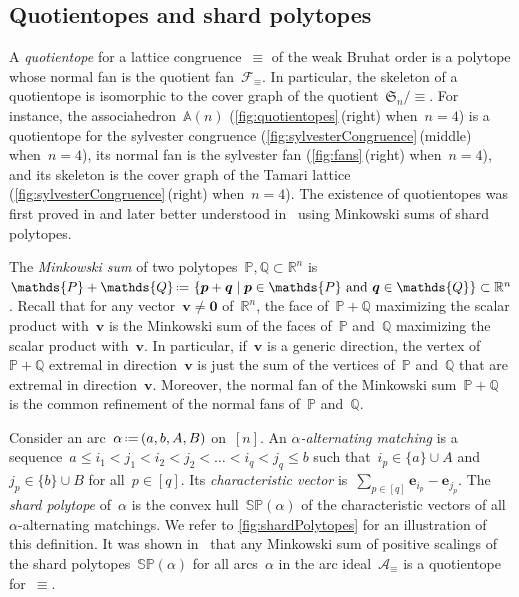 \documentclass{amsart}
\theoremstyle{definition}
\newcommand{\R}{\mathbb{R}} %
\renewcommand{\c}[1]{\mathcal{#1}} %
\renewcommand{\b}[1]{{\boldsymbol{#1}}} %
\newcommand{\f}[1]{\mathfrak{#1}} %
\newcommand{\set}[2]{\left\{ #1 \;\middle|\; #2 \right\}} %
\newcommand{\eqdef}{\mbox{\,\raisebox{0.2ex}{\scriptsize\ensuremath{\mathrm:}}\ensuremath{=}\,}} %
\newcommand{\darkblue}{\color{darkblue}} %
\newcommand{\defn}[1]{\textsl{\darkblue #1}} %
\newcommand{\polytope}[1]{\mathds{#1}} %
\newcommand{\Asso}{\polytope{A}} %
\newcommand{\SP}{\polytope{SP}}
\begin{document}

\subsection{Quotientopes and shard polytopes}
\label{subsec:quotientopes}

A \defn{quotientope} for a lattice congruence~$\equiv$ of the weak Bruhat order is a polytope whose normal fan is the quotient fan~$\c{F}_\equiv$.
In particular, the skeleton of a quotientope is isomorphic to the cover graph of the quotient~$\f{S}_n/{\equiv}$.
For instance, the associahedron~$\Asso(n)$ (\cref{fig:quotientopes}\,(right) when~$n = 4$) is a quotientope for the sylvester congruence (\cref{fig:sylvesterCongruence}\,(middle) when~$n = 4$), its normal fan is the sylvester fan (\cref{fig:fans}\,(right) when~$n = 4$), and its skeleton is the cover graph of the Tamari lattice (\cref{fig:sylvesterCongruence}\,(right) when~$n = 4$).
The existence of quotientopes was first proved in \cite{MR3964495} and later better understood in~\cite{MR4584712} using Minkowski sums of shard polytopes.

The \defn{Minkowski sum} of two polytopes~$\polytope{P}, \polytope{Q} \subset \R^n$ is~$\polytope{P} + \polytope{Q} \eqdef \set{\b{p} + \b{q}}{\b{p} \in \polytope{P} \text{ and } \b{q} \in \polytope{Q}} \subset \R^n$.
Recall that for any vector~$\b{v} \ne \b{0}$ of~$\R^n$, the face of~$\polytope{P} + \polytope{Q}$ maximizing the scalar product with~$\b{v}$ is the Minkowski sum of the faces of~$\polytope{P}$ and~$\polytope{Q}$ maximizing the scalar product with~$\b{v}$.
In particular, if~$\b{v}$ is a generic direction, the vertex of~$\polytope{P} + \polytope{Q}$ extremal in direction~$\b{v}$ is just the sum of the vertices of~$\polytope{P}$ and~$\polytope{Q}$ that are extremal in direction~$\b{v}$.
Moreover, the normal fan of the Minkowski sum~$\polytope{P} + \polytope{Q}$ is the common refinement of the normal fans of~$\polytope{P}$ and~$\polytope{Q}$.

Consider an arc~$\alpha \eqdef (a, b, A, B)$ on~$[n]$.
An \defn{$\alpha$-alternating matching} is a sequence~$a \le i_1 < j_1 < i_2 < j_2 < \dots < i_q < j_q \le b$ such that~$i_p \in \{a\} \cup A$ and~$j_p \in \{b\} \cup B$ for all~$p \in [q]$.
Its \defn{characteristic vector} is~$\sum_{p \in [q]} \b{e}_{i_p} - \b{e}_{j_p}$.
The \defn{shard polytope} of~$\alpha$ is the convex hull~$\SP(\alpha)$ of the characteristic vectors of all $\alpha$-alternating matchings.
We refer to \cref{fig:shardPolytopes} for an illustration of this definition.
It was shown in~\cite{MR4584712} that any Minkowski sum of positive scalings of the shard polytopes~$\SP(\alpha)$ for all arcs~$\alpha$ in the arc ideal~$\c{A}_\equiv$ is a quotientope for~$\equiv$.
\end{document}
